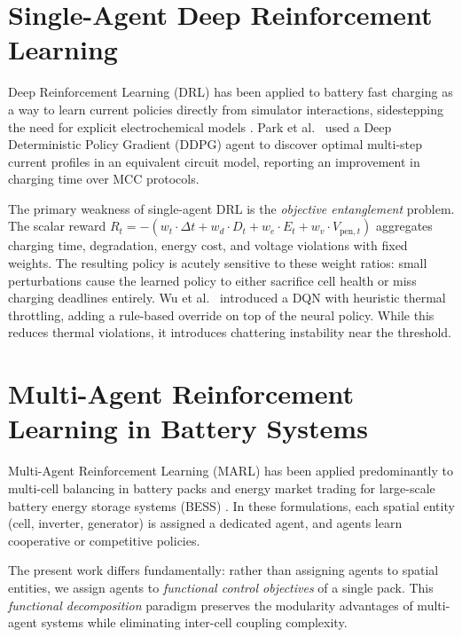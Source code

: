 \section{Single-Agent Deep Reinforcement Learning}

Deep Reinforcement Learning (DRL) has been applied to battery fast
charging as a way to learn current policies directly from
simulator interactions, sidestepping the need for explicit
electrochemical models \cite{park2020fastcharging, wu2021dqn}.
Park et al.~\cite{park2020fastcharging} used a Deep Deterministic
Policy Gradient (DDPG) agent to discover optimal multi-step
current profiles in an equivalent circuit model, reporting an
improvement in charging time over MCC protocols.

The primary weakness of single-agent DRL is the \emph{objective
entanglement} problem.  The scalar reward
$R_t = -(w_t \cdot \Delta t + w_d \cdot D_t + w_e \cdot E_t + w_v
\cdot V_{\mathrm{pen},t})$ aggregates charging time, degradation,
energy cost, and voltage violations with fixed weights.  The resulting
policy is acutely sensitive to these weight ratios: small
perturbations cause the learned policy to either sacrifice cell
health or miss charging deadlines entirely.  Wu et al.~\cite{wu2021dqn}
introduced a DQN with heuristic thermal throttling, adding a rule-based
override on top of the neural policy.  While this reduces thermal
violations, it introduces chattering instability near the threshold.

\section{Multi-Agent Reinforcement Learning in Battery Systems}

Multi-Agent Reinforcement Learning (MARL) has been applied
predominantly to multi-cell balancing in battery packs and energy
market trading for large-scale battery energy storage systems (BESS)
\cite{cao2020marl_energy, li2022marl_grid, zhang2022maddpg}.  In
these formulations, each spatial entity (cell, inverter, generator)
is assigned a dedicated agent, and agents learn cooperative or
competitive policies.

The present work differs fundamentally: rather than assigning agents
to spatial entities, we assign agents to \emph{functional control
objectives} of a single pack.  This \emph{functional decomposition}
paradigm preserves the modularity advantages of multi-agent systems
while eliminating inter-cell coupling complexity.

